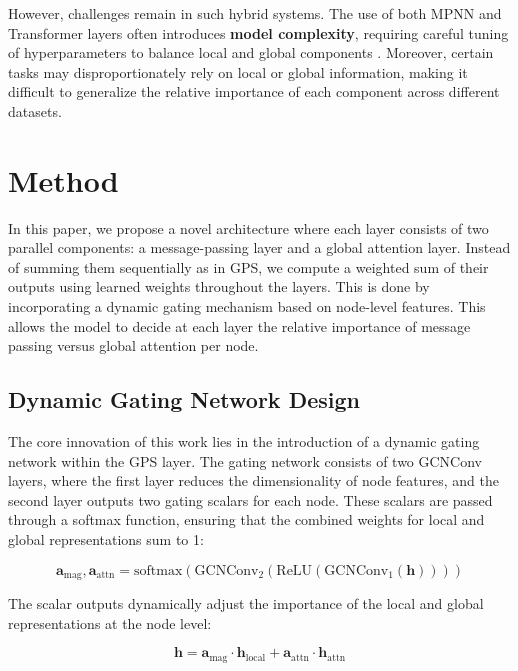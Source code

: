 \documentclass{acmart}
\begin{document}
However, challenges remain in such hybrid systems. The use of both MPNN and Transformer layers often introduces \textbf{model complexity}, requiring careful tuning of hyperparameters to balance local and global components \cite{Rampasek2022}. Moreover, certain tasks may disproportionately rely on local or global information, making it difficult to generalize the relative importance of each component across different datasets.

\section{Method}

In this paper, we propose a novel architecture where each layer consists of two parallel components: a message-passing layer and a global attention layer. Instead of summing them sequentially as in GPS, we compute a weighted sum of their outputs using learned weights throughout the layers. This is done by incorporating a dynamic gating mechanism based on node-level features. This allows the model to decide at each layer the relative importance of message passing versus global attention per node.

\subsection{Dynamic Gating Network Design}

The core innovation of this work lies in the introduction of a dynamic gating network within the GPS layer. The gating network consists of two GCNConv layers, where the first layer reduces the dimensionality of node features, and the second layer outputs two gating scalars for each node. These scalars are passed through a softmax function, ensuring that the combined weights for local and global representations sum to 1:

\begin{equation}
\mathbf{a}_{\text{mag}}, \mathbf{a}_{\text{attn}} = \text{softmax}\left(\text{GCNConv}_2\left(\text{ReLU}\left(\text{GCNConv}_1(\mathbf{h})\right)\right)\right)
\end{equation}

The scalar outputs dynamically adjust the importance of the local and global representations at the node level:

\begin{equation}
\mathbf{h} = \mathbf{a}_{\text{mag}} \cdot \mathbf{h}_{\text{local}} + \mathbf{a}_{\text{attn}} \cdot \mathbf{h}_{\text{attn}}
\end{equation}
\end{document}
